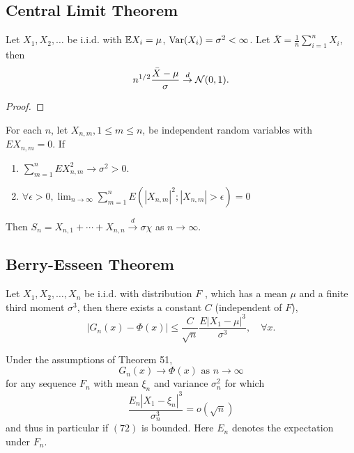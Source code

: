 \subsection{Central Limit Theorem}

\begin{theorem}
	\label{thm:classic-central-limit-theorem}
	Let $X_1,X_2,\ldots$ be i.i.d. with ${\mathbb E} X_{i}=\mu$, $\mathrm{Var}(X_{i})=\sigma^2<\infty$. Let $\bar{X}=\frac{1}{n}\sum_{i=1}^{n}X_{i}$, then
	\begin{equation}
		n^{1/2}\frac{\bar{X}-\mu}{\sigma}\stackrel{d}{\rightarrow}{\mathcal N}(0,1).
	\end{equation}
\end{theorem}

\begin{proof}

\end{proof}

\begin{theorem}
	For each $n$, let $X_{n,m},1\leq m\leq n$, be independent random variables with $EX_{n,m}=0$. If
	\begin{enumerate}
		\item $\sum_{m=1}^{n}EX_{n,m}^{2} \rightarrow \sigma^{2}>0$.
		\item $\forall\epsilon>0,\lim_{n\rightarrow\infty}\sum_{m=1}^{n}E\left(\left|X_{n,m}\right|^{2};\left|X_{n,m}\right|>\epsilon\right)=0$
	\end{enumerate}
	Then $S_{n}=X_{n,1}+\cdots+X_{n,n}\stackrel{d}{\rightarrow}\sigma\chi$ as $n\rightarrow\infty$.
\end{theorem}

\subsection{Berry-Esseen Theorem}

\begin{theorem}
	Let $X_{1},X_{2},\ldots,X_{n}$ be i.i.d. with distribution $F$ , which has a mean $\mu$ and a finite third moment $\sigma^{3}$, then there exists a constant $C$ (independent of $F$),
	\begin{equation}
		\left|G_{n}(x)-\Phi(x)\right|\leq\frac{C}{\sqrt{n}}\frac{E\left|X_{1}-\mu\right|^{3}}{\sigma^{3}},\quad\forall x.
	\end{equation}
\end{theorem}

\begin{corollary}
	Under the assumptions of Theorem 51,
	$$
		G_{n}(x) \rightarrow \Phi(x) \text { as } n \rightarrow \infty
	$$
	for any sequence $F_{n}$ with mean $\xi_{n}$ and variance $\sigma_{n}^{2}$ for which
	$$
		\frac{E_{n}\left|X_{1}-\xi_{n}\right|^{3}}{\sigma_{n}^{3}}=o(\sqrt{n})
	$$
	and thus in particular if $(72)$ is bounded. Here $E_{n}$ denotes the expectation under $F_{n}$.
\end{corollary}

